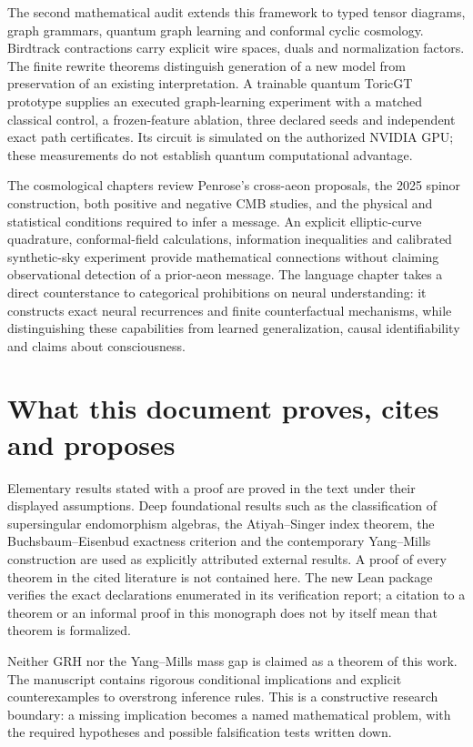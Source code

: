 The second mathematical audit extends this framework to typed tensor diagrams, graph grammars, quantum graph learning and conformal cyclic cosmology. Birdtrack contractions carry explicit wire spaces, duals and normalization factors. The finite rewrite theorems distinguish generation of a new model from preservation of an existing interpretation. A trainable quantum ToricGT prototype supplies an executed graph-learning experiment with a matched classical control, a frozen-feature ablation, three declared seeds and independent exact path certificates. Its circuit is simulated on the authorized NVIDIA GPU; these measurements do not establish quantum computational advantage.

The cosmological chapters review Penrose's cross-aeon proposals, the 2025 spinor construction, both positive and negative CMB studies, and the physical and statistical conditions required to infer a message. An explicit elliptic-curve quadrature, conformal-field calculations, information inequalities and calibrated synthetic-sky experiment provide mathematical connections without claiming observational detection of a prior-aeon message. The language chapter takes a direct counterstance to categorical prohibitions on neural understanding: it constructs exact neural recurrences and finite counterfactual mechanisms, while distinguishing these capabilities from learned generalization, causal identifiability and claims about consciousness.

\section*{What this document proves, cites and proposes}
Elementary results stated with a proof are proved in the text under their displayed assumptions. Deep foundational results such as the classification of supersingular endomorphism algebras, the Atiyah--Singer index theorem, the Buchsbaum--Eisenbud exactness criterion and the contemporary Yang--Mills construction are used as explicitly attributed external results. A proof of every theorem in the cited literature is not contained here. The new Lean package verifies the exact declarations enumerated in its verification report; a citation to a theorem or an informal proof in this monograph does not by itself mean that theorem is formalized.

Neither GRH nor the Yang--Mills mass gap is claimed as a theorem of this work. The manuscript contains rigorous conditional implications and explicit counterexamples to overstrong inference rules. This is a constructive research boundary: a missing implication becomes a named mathematical problem, with the required hypotheses and possible falsification tests written down.

